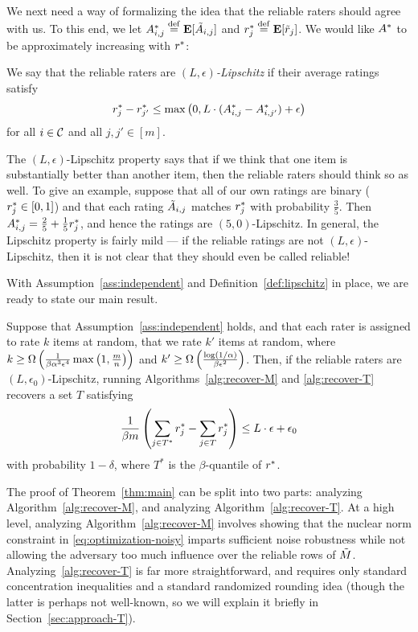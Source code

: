 We next need a way of formalizing the idea that the reliable raters should 
agree with us. To this end, we let 
$A^*_{i,j} \stackrel{\rm def}{=} \mathbf{E}[\tilde{A}_{i,j}]$ and $r^*_j \stackrel{\rm def}{=} \mathbf{E}[\tilde{r}_j]$. We 
would like $A^*$ to be approximately increasing with $r^*$:
\begin{definition}
\label{def:lipschitz}
We say that the reliable raters are \emph{$(L,\epsilon)$-Lipschitz} if their 
average ratings satisfy
\begin{equation}
\label{eq:lipschitz}
r^*_j - r^*_{j'} \leq \max\left( 0, L \cdot (A^*_{i,j} - A^*_{i,j'}) + \epsilon \right)
\end{equation}
for all $i \in \mathcal{C}$ and all $j,j' \in [m]$.
\end{definition}
The $(L,\epsilon)$-Lipschitz property says that if we think that one item is 
substantially better than another item, then the reliable raters should think 
so as well. To give an example, suppose that all of our own ratings are binary 
($r^*_j \in [0,1]$) and that each rating $\tilde{A}_{i,j}$ matches $r^*_j$ 
with probability $\frac{3}{5}$. Then 
$A^*_{i,j} = \frac{2}{5} + \frac{1}{5}r^*_j$, 
and hence the ratings are $(5,0)$-Lipschitz. 
In general, the Lipschitz property is fairly mild --- if the reliable ratings 
are not $(L,\epsilon)$-Lipschitz, then it is not clear that they should 
even be called reliable!

With Assumption~\ref{ass:independent} and Definition~\ref{def:lipschitz} 
in place, we are ready to state our main result. 

\begin{theorem}
\label{thm:main}
Suppose that Assumption~\ref{ass:independent} holds, and that each rater is 
assigned to rate $k$ items at random, that we rate $k'$ items at random, 
where $k \geq \Omega\left( \frac{1}{\beta\alpha^3\epsilon^4}\max\left( 1, \frac{m}{n} \right) \right)$ 
and $k' \geq \Omega\left( \frac{\log(1/\alpha)}{\beta\epsilon^2} \right)$.
Then, if the reliable raters are $(L,\epsilon_0)$-Lipschitz, running 
Algorithms~\ref{alg:recover-M} and \ref{alg:recover-T} recovers a set 
$T$ satisfying 
\[ \frac{1}{\beta m} \left( \sum_{j \in T^*} r^*_j - \sum_{j \in T} r^*_j \right) 
\leq L \cdot \epsilon + \epsilon_0 \]
with probability $1-\delta$, where $T^*$ is the $\beta$-quantile of $r^*$.
\end{theorem}

The proof of Theorem~\ref{thm:main} can be split into two parts: analyzing 
Algorithm~\ref{alg:recover-M}, and analyzing Algorithm~\ref{alg:recover-T}. 
At a high level, analyzing Algorithm~\ref{alg:recover-M} involves showing that 
the nuclear norm constraint in \eqref{eq:optimization-noisy} imparts sufficient 
noise robustness while not allowing the adversary too much influence over the 
reliable rows of $\tilde{M}$. Analyzing~\ref{alg:recover-T} is far more straightforward, 
and requires only standard concentration inequalities and a standard randomized 
rounding idea (though the latter is perhaps not well-known, so we will explain 
it briefly in Section~\ref{sec:approach-T}).

